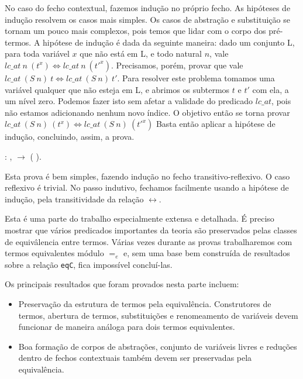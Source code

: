 No caso do fecho contextual, fazemos indução no próprio fecho. As hipóteses de
indução resolvem os casos mais simples. Os casos de abstração e substituição se
tornam um pouco mais complexos, pois temos que lidar com o corpo dos pré-termos.
A hipótese de indução é dada da seguinte maneira: dado um conjunto L, para toda
variável $x$ que não está em L, e todo natural $n$, vale $lc\_at\ n\ (t^x)
\iff lc\_at\ n\ (t'^x)$. Precisamos, porém, provar que vale $lc\_at\ (S\ n)\ t
\iff lc\_at\ (S\ n)\ t'$. Para resolver este problema tomamos uma variável qualquer
que não esteja em L, e abrimos os subtermos $t$ e $t'$ com ela, a um nível zero.
Podemos fazer isto sem afetar a validade do predicado $lc\_at$, pois não
estamos adicionando nenhum novo índice. O objetivo então se torna provar
$lc\_at\ (S\ n)\ (t^x) \iff lc\_at\ (S\ n)\ (t'^x)$ Basta então aplicar a hipótese de
indução, concluindo, assim, a prova.

\bigskip 
\coqnoindent {}  :
\coqdockw{\ensuremath{\forall}}   ,
 
 \ensuremath{\rightarrow} (
  
  ).\coqdoceol
\bigskip

Esta prova é bem simples, fazendo indução no fecho transitivo-reflexivo. O caso
reflexivo é trivial. No passo indutivo, fechamos facilmente usando a hipótese de
indução, pela transitividade da relação $\leftrightarrow$.


Esta é uma parte do trabalho especialmente extensa e detalhada. É preciso
mostrar que vários predicados importantes da teoria são preservados pelas
classes de equivâlencia entre termos. Várias vezes durante as provas
trabalharemos com termos equivalentes módulo $=_e$ e, sem uma base bem
construída de resultados sobre a relação \texttt{eqC}, fica impossível
concluí-las.

Os principais resultados que foram provados nesta parte incluem:

\begin{itemize}
    \item Preservação da estrutura de termos pela equivalência. Construtores de
        termos, abertura de termos, substituições e renomeamento de variáveis
        devem funcionar de maneira análoga para dois termos equivalentes.
    \item Boa formação de corpos de abstrações, conjunto de variáveis
        livres e reduções dentro de fechos contextuais também devem ser
        preservadas pela equivalência.
\end{itemize}

